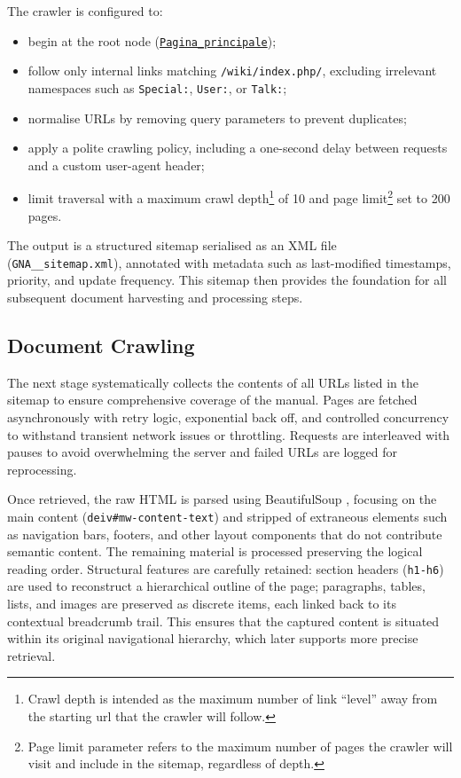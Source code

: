 \begin{spacing}{1.5}
The crawler is configured to:
\begin{itemize}
      \item begin at the root node (\texttt{\href{https://web.archive.org/web/20250803092155/https://gna.cultura.gov.it/wiki/index.php/Pagina_principale}{Pagina\_principale}}\nocite{noauthor_wiki_2025});
      \item follow only internal links matching \texttt{/wiki/index.php/}, excluding irrelevant namespaces such as \texttt{Special:}, \texttt{User:}, or \texttt{Talk:};
      \item normalise URLs by removing query parameters to prevent duplicates;
      \item apply a polite crawling policy, including a one-second delay between requests and a custom user-agent header;
      \item limit traversal with a maximum crawl depth\footnote{Crawl depth is intended as the maximum number of link ``level'' away from the starting url that the crawler will follow.} of 10 and page limit\footnote{Page limit parameter refers to the maximum number of pages the crawler will visit and include in the sitemap, regardless of depth.} set to 200 pages.
\end{itemize}

The output is a structured sitemap serialised as an XML file (\texttt{GNA\_\_sitemap.xml}), annotated with metadata such as last-modified timestamps, priority, and update frequency. This sitemap then provides the foundation for all subsequent document harvesting and processing steps.

\subsection{Document Crawling}
The next stage systematically collects the contents of all URLs listed in the sitemap to ensure comprehensive coverage of the manual. Pages are fetched asynchronously with retry logic, exponential back off, and controlled concurrency to withstand transient network issues or throttling. Requests are interleaved with pauses to avoid overwhelming the server and failed URLs are logged for reprocessing.

Once retrieved, the raw HTML is parsed using BeautifulSoup \citep{hajba_website_2018}, focusing on the main content (\texttt{deiv\#mw-content-text}) and stripped of extraneous elements such as navigation bars, footers, and other layout components that do not contribute semantic content. The remaining material is processed preserving the logical reading order. Structural features are carefully retained: section headers (\texttt{h1-h6}) are used to reconstruct a hierarchical outline of the page; paragraphs, tables, lists, and images are preserved as discrete items, each linked back to its contextual breadcrumb trail. This ensures that the captured content is situated within its original navigational hierarchy, which later supports more precise retrieval.


\end{spacing}
